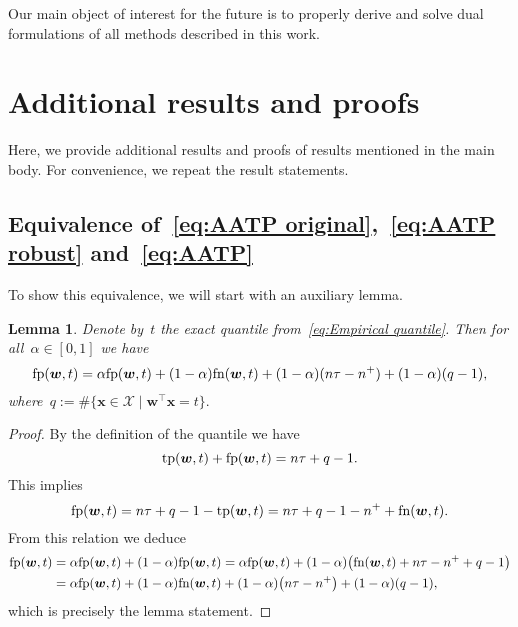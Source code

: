 \documentclass[11pt,a4paper]{article}
\newtheorem{lemma}[thm]{Lemma}
\theoremstyle{definition}
\let\originalleft\left
\let\originalright\right
\renewcommand{\left}{\mathopen{}\mathclose\bgroup\originalleft}
\renewcommand{\right}{\aftergroup\egroup\originalright}
\newcommand{\X}{\mathcal{X}}
\newcommand{\tp}{\textnormal{tp}}
\newcommand{\fp}{\textnormal{fp}}
\newcommand{\fn}{\textnormal{fn}}
\begin{document}
\noindent Our main object of interest for the future is to properly derive and solve dual formulations of all methods described in this work.

\appendix
\section{Additional results and proofs}\label{app:Additional results and proofs}

Here, we provide additional results and proofs of results mentioned in the main body. For convenience, we repeat the result statements.

\subsection{Equivalence of~\eqref{eq:AATP original},~\eqref{eq:AATP robust} and~\eqref{eq:AATP}}

To show this equivalence, we will start with an auxiliary lemma.

\begin{lemma}\label{lemma:fnfp_equivalence}
  Denote by~$t$ the exact quantile from~\eqref{eq:Empirical quantile}. Then for all~$\alpha\in[0,1]$ we have
  \begin{equation*}
    \fp(\bm{w},t) = \alpha \fp(\bm{w},t) + (1-\alpha)\fn(\bm{w},t) + (1-\alpha)(n\tau - n^+) + (1-\alpha)(q - 1),
  \end{equation*}
  where~$q:= \#\{\bm{x} \in \X \mid \bm{w}^\top \bm{x} = t\}.$
\end{lemma}

\begin{proof}
  By the definition of the quantile we have
  \begin{equation*}
    \tp(\bm{w},t) + \fp(\bm{w},t) = n \tau + q - 1.
  \end{equation*}
  This implies
  \begin{equation*}
    \fp(\bm{w},t) = n \tau + q - 1 -\tp(\bm{w},t)
                  = n \tau + q - 1 - n^{+} +\fn(\bm{w},t).
  \end{equation*}
  From this relation we deduce
  \begin{align*}
    \fp(\bm{w},t) & = \alpha \fp(\bm{w},t) + (1-\alpha)\fp(\bm{w},t)
                    = \alpha \fp(\bm{w},t) + (1-\alpha)\left(\fn(\bm{w},t) + n\tau - n^+ + q - 1\right)\\
                  & = \alpha \fp(\bm{w},t) + (1-\alpha)\fn(\bm{w},t) + (1-\alpha)\left(n\tau - n^+\right) + (1-\alpha)\left(q - 1\right),
  \end{align*}
  which is precisely the lemma statement.
\end{proof}
\end{document}
